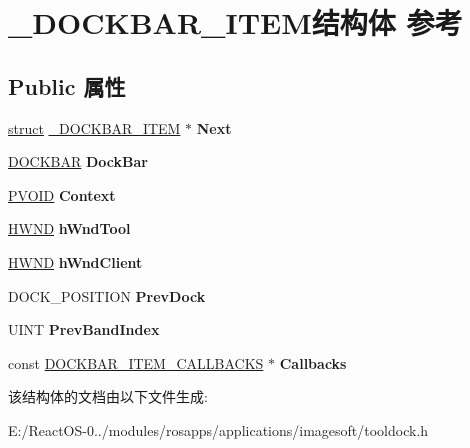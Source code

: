 \hypertarget{struct___d_o_c_k_b_a_r___i_t_e_m}{}\section{\+\_\+\+D\+O\+C\+K\+B\+A\+R\+\_\+\+I\+T\+E\+M结构体 参考}
\label{struct___d_o_c_k_b_a_r___i_t_e_m}
\subsection*{Public 属性}
\begin{DoxyCompactItemize}
\item 
\mbox{\label{struct___d_o_c_k_b_a_r___i_t_e_m_aa9d10d6fee663dc174cd2b045f27aeaf}} 
\hyperlink{interfacestruct}{struct} \hyperlink{struct___d_o_c_k_b_a_r___i_t_e_m}{\+\_\+\+D\+O\+C\+K\+B\+A\+R\+\_\+\+I\+T\+EM} $\ast$ {\bfseries Next}
\item 
\mbox{\label{struct___d_o_c_k_b_a_r___i_t_e_m_a8d0bd77008e4d1569f4b50c70486005c}} 
\hyperlink{struct___d_o_c_k_b_a_r}{D\+O\+C\+K\+B\+AR} {\bfseries Dock\+Bar}
\item 
\mbox{\label{struct___d_o_c_k_b_a_r___i_t_e_m_a7ebb34d9768ef836f5bf428e11b6f924}} 
\hyperlink{interfacevoid}{P\+V\+O\+ID} {\bfseries Context}
\item 
\mbox{\label{struct___d_o_c_k_b_a_r___i_t_e_m_a8223f8245d4100b1dc13802c00a4be90}} 
\hyperlink{interfacevoid}{H\+W\+ND} {\bfseries h\+Wnd\+Tool}
\item 
\mbox{\label{struct___d_o_c_k_b_a_r___i_t_e_m_a934ce14f37ddb55cb69d87de33b8ffe7}} 
\hyperlink{interfacevoid}{H\+W\+ND} {\bfseries h\+Wnd\+Client}
\item 
\mbox{\label{struct___d_o_c_k_b_a_r___i_t_e_m_a8a8d0a309f6768421fe27ee033069ea6}} 
D\+O\+C\+K\+\_\+\+P\+O\+S\+I\+T\+I\+ON {\bfseries Prev\+Dock}
\item 
\mbox{\label{struct___d_o_c_k_b_a_r___i_t_e_m_a4aa83c4b4dffa8c7a35d5cb7350e7b54}} 
U\+I\+NT {\bfseries Prev\+Band\+Index}
\item 
\mbox{\label{struct___d_o_c_k_b_a_r___i_t_e_m_ac1ade80fb6b1a11ee840387733ff5cd2}} 
const \hyperlink{struct___d_o_c_k_b_a_r___i_t_e_m___c_a_l_l_b_a_c_k_s}{D\+O\+C\+K\+B\+A\+R\+\_\+\+I\+T\+E\+M\+\_\+\+C\+A\+L\+L\+B\+A\+C\+KS} $\ast$ {\bfseries Callbacks}
\end{DoxyCompactItemize}


该结构体的文档由以下文件生成\+:\begin{DoxyCompactItemize}
\item 
E\+:/\+React\+O\+S-\/0../modules/rosapps/applications/imagesoft/tooldock.\+h\end{DoxyCompactItemize}
